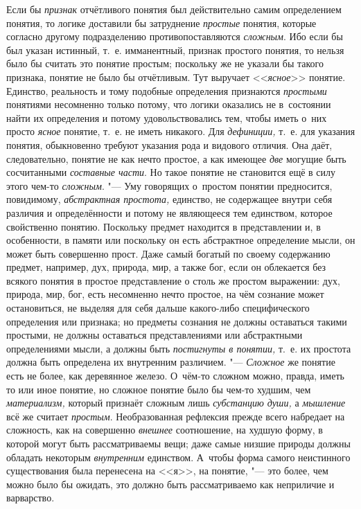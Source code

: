 Если бы {\em признак} отчётливого понятия был действительно самим определением
понятия, то логике доставили бы затруднение {\em простые} понятия,
которые согласно другому подразделению противопоставляются {\em сложным}. Ибо
если бы был указан истинный, т.~е. имманентный, признак простого понятия, то
нельзя было бы считать это понятие простым; поскольку же не указали бы
такого признака, понятие не было бы отчётливым. Тут выручает <<{\em ясное}>>
понятие. Единство, реальность и тому подобные определения признаются
{\em простыми} понятиями несомненно только потому, что логики оказались не
в~состоянии найти их определения и потому удовольствовались тем, чтобы иметь
о~них просто {\em ясное} понятие, т.~е. не иметь никакого. Для {\em дефиниции,}
т.~е. для указания понятия, обыкновенно требуют указания рода и видового
отличия. Она даёт, следовательно, понятие не как нечто простое, а как имеющее
{\em две} могущие быть сосчитанными {\em составные части}. Но такое понятие
не становится ещё в силу этого чем-то {\em сложным}. "--- Уму говорящих
о~простом понятии предносится, повидимому, {\em абстрактная простота,}
единство, не содержащее внутри себя различия и определённости
и потому не являющееся тем единством, которое свойственно понятию.
Поскольку предмет находится в представлении и, в особенности, в памяти или
поскольку он есть абстрактное определение мысли, он может быть совершенно
прост. Даже самый богатый по своему содержанию предмет, например, дух,
природа, мир, а также бог, если он облекается без всякого понятия в простое
представление о столь же простом выражении: дух, природа, мир, бог, есть
несомненно нечто простое, на чём сознание может остановиться, не выделяя
для себя дальше какого-либо специфического определения или признака; но
предметы сознания не должны оставаться такими простыми, не должны
оставаться представлениями или абстрактными определениями мысли, а должны
быть {\em постигнуты в понятии,} т.~е. их простота должна быть определена их
внутренним различием. "--- {\em Сложное} же понятие есть не более, как
деревянное железо. О~чём-то сложном можно, правда, иметь то или иное понятие,
но сложное понятие было бы чем-то худшим, чем {\em материализм,} который
признаёт сложным лишь {\em субстанцию души,} а {\em мышление} всё же считает
{\em простым}. Необразованная рефлексия прежде всего набредает на сложность,
как на совершенно {\em внешнее} соотношение, на худшую форму, в которой могут
быть рассматриваемы вещи; даже самые низшие природы должны обладать некоторым
{\em внутренним} единством. А~чтобы форма самого неистинного существования была
перенесена на <<я>>, на понятие, "--- это более, чем можно было бы ожидать, это
должно быть рассматриваемо как неприличие и варварство.

